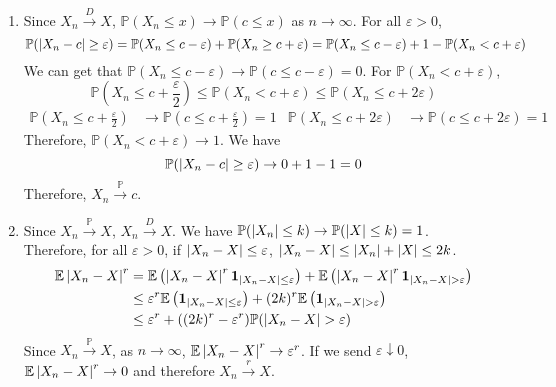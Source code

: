 \documentclass{huhtakm-template-book}
\newcommand{\prob}{\mathbb{P}}
\newcommand{\expect}{\mathbb{E}}
\begin{document}
    \begin{proofing}
        \begin{enumerate}
            \item Since $X_{n}\xrightarrow{D}X$, $\prob(X_{n}\leq x)\to\prob(c\leq x)$ as $n\to\infty$. For all $\varepsilon>0$,
            \begin{equation*}
                \prob(\abs{X_{n}-c}\geq\varepsilon)=\prob(X_{n}\leq c-\varepsilon)+\prob(X_{n}\geq c+\varepsilon)=\prob(X_{n}\leq c-\varepsilon)+1-\prob(X_{n}<c+\varepsilon)
            \end{equation*}
            We can get that $\prob(X_{n}\leq c-\varepsilon)\to\prob(c\leq c-\varepsilon)=0$. For $\prob(X_{n}<c+\varepsilon)$,
            \begin{equation*}
                \prob\left(X_{n}\leq c+\frac{\varepsilon}{2}\right)\leq\prob(X_{n}<c+\varepsilon)\leq\prob(X_{n}\leq c+2\varepsilon)
            \end{equation*}
            \begin{align*}
                \prob\left(X_{n}\leq c+\frac{\varepsilon}{2}\right)&\to\prob\left(c\leq c+\frac{\varepsilon}{2}\right)=1 & \prob(X_{n}\leq c+2\varepsilon)&\to\prob(c\leq c+2\varepsilon)=1
            \end{align*}
            Therefore, $\prob(X_{n}<c+\varepsilon)\to 1$. We have
            \begin{equation*}
                \prob(\abs{X_{n}-c}\geq\varepsilon)\to 0+1-1 = 0
            \end{equation*}
            Therefore, $X_{n}\xrightarrow{\prob}c$.
            \item Since $X_{n}\xrightarrow{\prob}X$, $X_{n}\xrightarrow{D}X$. We have $\prob(\abs{X_{n}}\leq k)\to\prob(\abs{X}\leq k)=1$.\\
            Therefore, for all $\varepsilon>0$, if $\left|{X_{n}-X}\right|\leq\varepsilon$, $\left|{X_{n}-X}\right|\leq\left|{X_{n}}\right|+\left|{X}\right|\leq 2k$.
            \begin{align*}
                \expect\abs{X_{n}-X}^{r}&=\expect\left(\abs{X_{n}-X}^{r}\mathbf{1}_{\abs{X_{n}-X}\leq\varepsilon}\right)+\expect\left(\abs{X_{n}-X}^{r}\mathbf{1}_{\abs{X_{n}-X}>\varepsilon}\right)\\
                &\leq\varepsilon^{r}\expect\left(\mathbf{1}_{\abs{X_{n}-X}\leq\varepsilon}\right)+(2k)^{r}\expect\left(\mathbf{1}_{\abs{X_{n}-X}>\varepsilon}\right)\\
                &\leq\varepsilon^{r}+((2k)^{r}-\varepsilon^{r})\prob(\abs{X_{n}-X}>\varepsilon)
            \end{align*}
            Since $X_{n}\xrightarrow{\prob}X$, as $n\to\infty$, $\expect\abs{X_{n}-X}^{r}\to\varepsilon^{r}$. If we send $\varepsilon\downarrow 0$, $\expect\abs{X_{n}-X}^{r}\to 0$ and therefore $X_{n}\xrightarrow{r}X$.
        \end{enumerate}
    \end{proofing}
\end{document}
